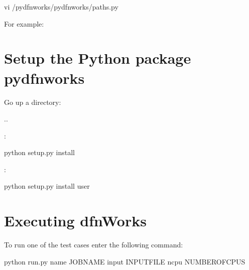 \documentclass[letterpaper,10pt,english]{sphinxmanual}
\begin{document}
\begin{sphinxVerbatim}[commandchars=\\\{\}]
\PYGZdl{} vi /pydfnworks/pydfnworks/paths.py
\end{sphinxVerbatim}

For example:

\begin{sphinxVerbatim}[commandchars=\\\{\}]
\PYG{p}{[}\PYG{p}{]}  
\end{sphinxVerbatim}


\section{Setup the Python package pydfnworks}
\label{\detokenize{tutorial:setup-the-python-package-pydfnworks}}
Go up a directory:

\begin{sphinxVerbatim}[commandchars=\\\{\}]
\PYGZdl{}  ..
\end{sphinxVerbatim}

:

\begin{sphinxVerbatim}[commandchars=\\\{\}]
\PYGZdl{} python setup.py install
\end{sphinxVerbatim}

:

\begin{sphinxVerbatim}[commandchars=\\\{\}]
\PYGZdl{} python setup.py install \PYGZhy{}\PYGZhy{}user
\end{sphinxVerbatim}


\section{Executing dfnWorks}
\label{\detokenize{tutorial:executing-dfnworks}}
To run one of the test cases enter the following command:

\begin{sphinxVerbatim}[commandchars=\\\{\}]
\PYGZdl{} python run.py \PYGZhy{}name \PYG{o}{[}JOBNAME\PYG{o}{]} \PYGZhy{}input \PYG{o}{[}INPUT\PYGZus{}FILE\PYG{o}{]} \PYGZhy{}ncpu \PYG{o}{[}NUMBER\PYGZus{}OF\PYGZus{}CPUS\PYG{o}{]}
\end{sphinxVerbatim}
\end{document}

